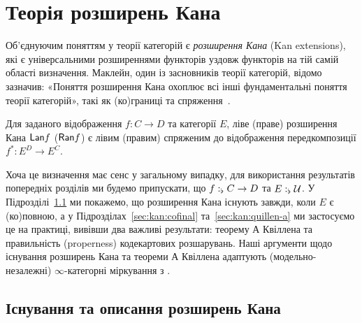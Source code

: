 \documentclass[12pt]{article}
\newcommand{\textcite}{\cite}
\newcommand{\parencite}{\cite}
\newcommand{\GM}{\flat}
\begin{document}
\section{Теорія розширень Кана}
\label{sec:kan}
Об'єднуючим поняттям у теорії категорій є \emph{розширення Кана} (Kan extensions), які є універсальними розширеннями функторів уздовж функторів на тій самій області визначення. Маклейн, один із засновників теорії категорій, відомо зазначив: «Поняття розширення Кана охоплює всі інші фундаментальні поняття теорії категорій», такі як (ко)границі та спряження~\parencite{maclane:1978,riehl:2014}.

\begin{defi}
  Для заданого відображення $f : C \to D$ та категорії $E$, ліве (праве) розширення Кана $\mathsf{Lan}{f}$ ($\mathsf{Ran}{f}$) є лівим (правим) спряженим до відображення передкомпозиції $f^* : E^D \to E^C$.
\end{defi}

Хоча це визначення має сенс у загальному випадку, для використання результатів попередніх розділів ми будемо припускати, що $\DeclVar{f}{\GM}{C \to D}$ та $\DeclVar{E}{\GM}{\Uni}$. У Підрозділі~\ref{sec:kan:existence} ми покажемо, що розширення Кана існують завжди, коли $E$ є (ко)повною, а у Підрозділах~\ref{sec:kan:cofinal} та~\ref{sec:kan:quillen-a} ми застосуємо це на практиці, вивівши два важливі результати: теорему А Квіллена та правильність (properness) кодекартових розшарувань. Наші аргументи щодо існування розширень Кана та теореми А Квіллена адаптують (модельно-незалежні) $\infty$-категорні міркування з \textcite{ramzi:bousfield-kan}.

\subsection{Існування та описання розширень Кана}
\label{sec:kan:existence}
\end{document}

